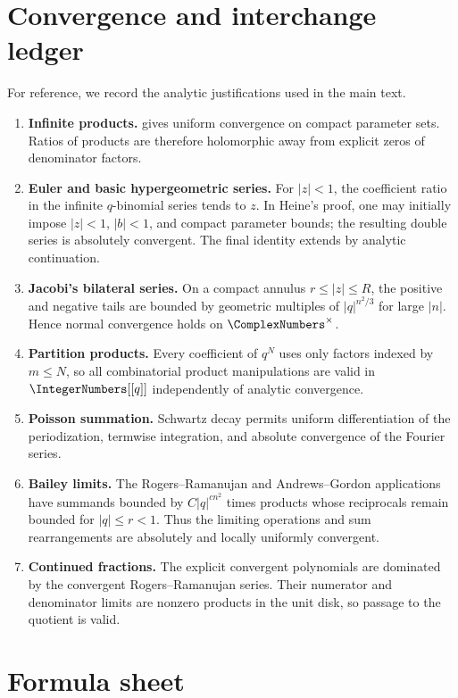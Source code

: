 \documentclass[11pt]{article}
\theoremstyle{blueplain}
\theoremstyle{bluedef}
\begin{document}
\section{Convergence and interchange ledger}

For reference, we record the analytic justifications used in the main text.

\begin{enumerate}[label=\textbf{A.\arabic*.}]
\item \textbf{Infinite products.}   gives uniform convergence on compact parameter sets.  Ratios of products are therefore holomorphic away from explicit zeros of denominator factors.
\item \textbf{Euler and basic hypergeometric series.}  For $|z|<1$, the coefficient ratio in the infinite $q$-binomial series tends to $z$.  In Heine's proof, one may initially impose $|z|<1$, $|b|<1$, and compact parameter bounds; the resulting double series is absolutely convergent.  The final identity extends by analytic continuation.
\item \textbf{Jacobi's bilateral series.}  On a compact annulus $r\le|z|\le R$, the positive and negative tails are bounded by geometric multiples of $|q|^{n^2/3}$ for large $|n|$.  Hence normal convergence holds on $\ComplexNumbers^\times$.
\item \textbf{Partition products.}  Every coefficient of $q^N$ uses only factors indexed by $m\le N$, so all combinatorial product manipulations are valid in $\IntegerNumbers[[q]]$ independently of analytic convergence.
\item \textbf{Poisson summation.}  Schwartz decay permits uniform differentiation of the periodization, termwise integration, and absolute convergence of the Fourier series.
\item \textbf{Bailey limits.}  The Rogers--Ramanujan and Andrews--Gordon applications have summands bounded by $C|q|^{cn^2}$ times products whose reciprocals remain bounded for $|q|\le r<1$.  Thus the limiting operations and sum rearrangements are absolutely and locally uniformly convergent.
\item \textbf{Continued fractions.}  The explicit convergent polynomials are dominated by the convergent Rogers--Ramanujan series.  Their numerator and denominator limits are nonzero products in the unit disk, so passage to the quotient is valid.
\end{enumerate}

\section{Formula sheet}
\end{document}
